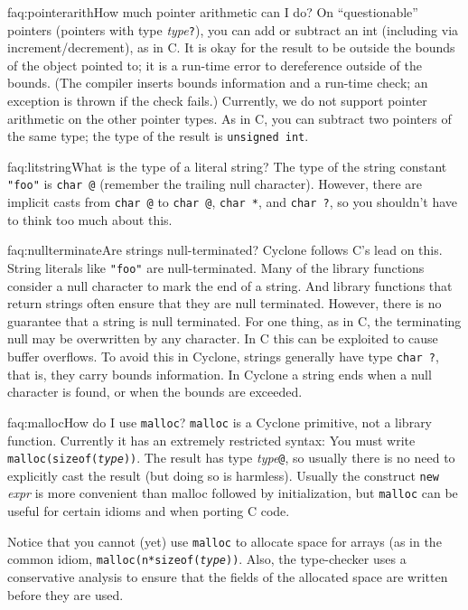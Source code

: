 \begin{faqa}{faq:pointerarith}{How much pointer arithmetic can I do?}
On ``questionable'' pointers (pointers with type
\textit{type}\texttt{?}), you can add or subtract an int (including
via increment/decrement), as in C\@.  It is okay for the result to be
outside the bounds of the object pointed to; it is a run-time error to
dereference outside of the bounds.  (The compiler inserts bounds
information and a run-time check; an exception is thrown if the check
fails.)  Currently, we do not support pointer arithmetic on the other
pointer types.  As in C, you can subtract two pointers of the same
type; the type of the result is \texttt{unsigned int}.
\end{faqa}

\begin{faqa}{faq:litstring}{What is the type of a literal string?}
The type of the string constant \texttt{"foo"} is \texttt{char @\rb} (remember the trailing null character).  However, there are implicit
casts from \texttt{char @\rb} to \texttt{char @\rb},
\texttt{char *\rb}, and \texttt{char ?}, so you shouldn't have to
think too much about this.
\end{faqa}

\begin{faqa}{faq:nullterminate}{Are strings null-terminated?}
Cyclone follows C's lead on this.  String literals like \texttt{"foo"}
are null-terminated.  Many of the library functions consider a null
character to mark the end of a string.  And library functions that
return strings often ensure that they are null terminated.  However,
there is no guarantee that a string is null terminated.  For one
thing, as in C, the terminating null may be overwritten by any
character.  In C this can be exploited to cause buffer overflows.  To
avoid this in Cyclone, strings generally have type \texttt{char ?},
that is, they carry bounds information.  In Cyclone a string ends when
a null character is found, or when the bounds are exceeded.
\end{faqa}

\begin{faqa}{faq:malloc}{How do I use \texttt{malloc}?}
\texttt{malloc} is a Cyclone primitive, not a library function.
Currently it has an extremely restricted syntax: You must write
\texttt{malloc(sizeof(\textit{type}))}.  The result has type
\textit{type}\texttt{@}, so usually there is no need to explicitly
cast the result (but doing so is harmless).  Usually the construct
\texttt{new} \textit{expr} is more convenient than malloc followed by
initialization, but \texttt{malloc} can be useful for certain idioms
and when porting C code.

Notice that you cannot (yet) use \texttt{malloc} to allocate space for
arrays (as in the common idiom, \texttt{malloc(n*sizeof({\it type}))}.
Also, the type-checker uses a conservative analysis to ensure that the
fields of the allocated space are written before they are used.
\end{faqa}

